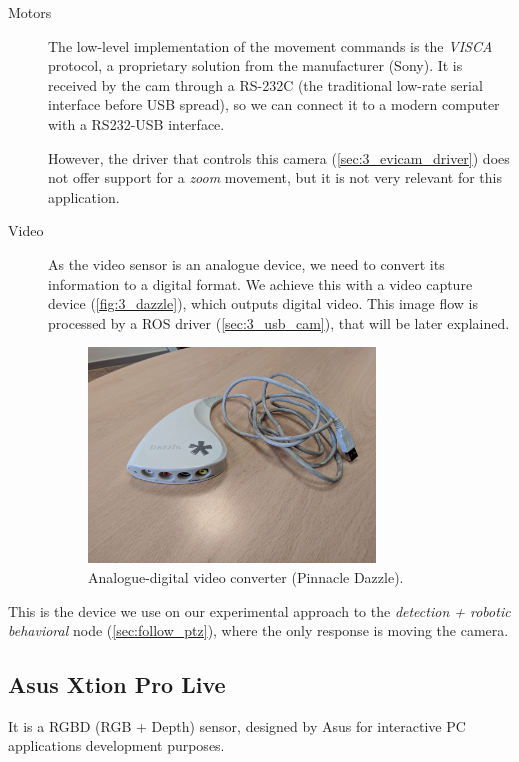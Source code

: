 		\begin{description}
			\item[Motors] 
			The low-level implementation of the movement commands is the \emph{VISCA} protocol, a proprietary solution from the manufacturer (Sony). It is received by the cam through a RS-232C (the traditional low-rate serial interface before USB spread), so we can connect it to a modern computer with a RS232-USB interface.
			
			However, the driver that controls this camera (\autoref{sec:3_evicam_driver}) does not offer support for a \emph{zoom} movement, but it is not very relevant for this application.\\
			
			\item[Video] 		As the video sensor is an analogue device, we need to convert its information to a digital format. We achieve this with a video capture device (\autoref{fig:3_dazzle}), which outputs digital video. This image flow is processed by a ROS driver (\autoref{sec:3_usb_cam}), that will be later explained.
			
			\begin{figure}[h]
				\centering
				\includegraphics[width=3in]{images/pinnacle_dazzle}
				\caption{Analogue-digital video converter (Pinnacle Dazzle).}
				\label{fig:3_dazzle}
			\end{figure}
			
			
		\end{description}



		This is the device we use on our experimental approach to the \emph{detection + robotic behavioral} node (\autoref{sec:follow_ptz}), where the only response is moving the camera.\\

	\subsection{Asus Xtion Pro Live}
		\label{sec:3_xtion}
		It is a RGBD (RGB + Depth) sensor, designed by Asus for interactive PC applications development purposes.

